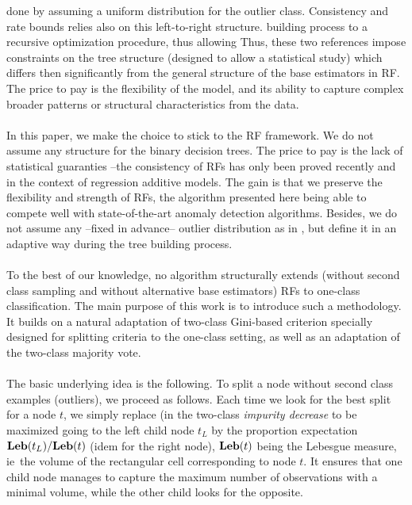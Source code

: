 done by assuming a uniform distribution for the outlier class. Consistency and
rate bounds relies also on this left-to-right structure.  %
building process to a recursive optimization procedure, thus allowing
%
%
Thus, these two references \citep{Scott2006, CLEM14} impose constraints on the
tree structure (designed to allow a statistical study) which differs then
significantly from the general structure of the base estimators in \ac{RF}. The
price to pay is the flexibility of the model, and its ability to capture
complex broader patterns or structural characteristics from the data.
\paragraph{}
In this paper, we make the choice to stick to the \ac{RF} framework. We
do not assume any structure for the binary decision trees. The price to pay is
the lack of statistical guaranties --the consistency of \acp{RF} has only been
proved recently \citep{Scornet2015} and in the context of regression additive
models.  The gain is that we preserve the flexibility and strength of \acp{RF},
the algorithm presented here being able to compete well with state-of-the-art
anomaly detection algorithms. Besides, we do not assume any --fixed in
advance-- outlier distribution as in \citet{CLEM14}, but define it in an
adaptive way during the tree building process.
\paragraph{}
To the best of our knowledge, no algorithm structurally extends (without second
class sampling and without alternative base estimators) \acp{RF} to one-class
classification. %
The main purpose of this work is to introduce such a methodology. It builds on
a natural adaptation of two-class
Gini-based criterion specially designed for splitting criteria to the one-class
setting, as well as an adaptation of the two-class majority vote.
\paragraph{}
The basic underlying idea is the following. To split a node without second
class examples (outliers), we proceed as follows.  Each time we look for the
best split for a node $t$, we simply replace (in the two-class \emph{impurity
decrease} to be maximized %
going to the left child node $t_L$ by the proportion expectation
$\mathbf{Leb}(t_L)/\mathbf{Leb}(t)$ (idem for the right node), $\mathbf{Leb}(t)$ being the Lebesgue
measure, \acs{ie}~the volume of the rectangular cell corresponding to node $t$.
It ensures that one child node manages to capture the maximum number of
observations with a minimal volume, while the other child looks for the
opposite. %
